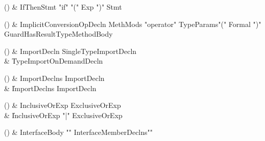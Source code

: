 \begin{bbgrammarappendix}

() & IfThenStmt \label{prod:IfThenStmt}  \: \xcd"if" \xcd"(" Exp \xcd")" Stmt  \\


\end{bbgrammarappendix}

\begin{bbgrammarappendix}

() & ImplicitConversionOpDecln \label{prod:ImplicitConversionOpDecln}  \: MethMods \xcd"operator" TypeParams\opt \xcd"(" Formal  \xcd")" Guard\opt HasResultType\opt MethodBody  \\


\end{bbgrammarappendix}

\begin{bbgrammarappendix}

() & ImportDecln \label{prod:ImportDecln}  \: SingleTypeImportDecln  \\

 &    \| TypeImportOnDemandDecln \\

\end{bbgrammarappendix}

\begin{bbgrammarappendix}

() & ImportDeclns \label{prod:ImportDeclns}  \: ImportDecln  \\

 &    \| ImportDeclns ImportDecln \\

\end{bbgrammarappendix}

\begin{bbgrammarappendix}

() & InclusiveOrExp \label{prod:InclusiveOrExp}  \: ExclusiveOrExp  \\

 &    \| InclusiveOrExp \xcd"|" ExclusiveOrExp \\

\end{bbgrammarappendix}

\begin{bbgrammarappendix}

() & InterfaceBody \label{prod:InterfaceBody}  \: \xcd"{" InterfaceMemberDeclns\opt \xcd"}"  \\


\end{bbgrammarappendix}

